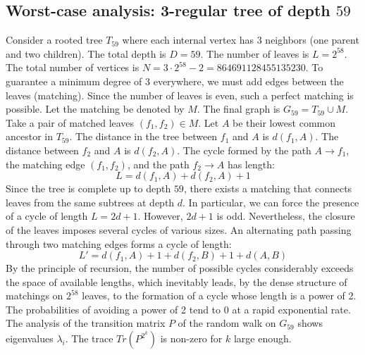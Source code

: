 \documentclass[11pt,a4paper]{article}
\begin{document}
\subsection{Worst-case analysis: 3-regular tree of depth $59$}
Consider a rooted tree $T_{59}$ where each internal vertex has 3 neighbors (one parent and two children).
The total depth is $D = 59$.
The number of leaves is $L = 2^{58}$.
The total number of vertices is $N = 3 \cdot 2^{58} - 2 = 864691128455135230$.
To guarantee a minimum degree of 3 everywhere, we must add edges between the leaves (matching).
Since the number of leaves is even, such a perfect matching is possible.
Let the matching be denoted by $M$. The final graph is $G_{59} = T_{59} \cup M$.
Take a pair of matched leaves $(f_1, f_2) \in M$.
Let $A$ be their lowest common ancestor in $T_{59}$.
The distance in the tree between $f_1$ and $A$ is $d(f_1, A)$.
The distance between $f_2$ and $A$ is $d(f_2, A)$.
The cycle formed by the path $A \to f_1$, the matching edge $(f_1, f_2)$, and the path $f_2 \to A$ has length:
$$ L = d(f_1, A) + d(f_2, A) + 1 $$
Since the tree is complete up to depth $59$, there exists a matching that connects leaves from the same subtrees at depth $d$.
In particular, we can force the presence of a cycle of length $L = 2d + 1$. However, $2d+1$ is odd.
Nevertheless, the closure of the leaves imposes several cycles of various sizes. An alternating path passing through two matching edges forms a cycle of length:
$$ L' = d(f_1, A) + 1 + d(f_2, B) + 1 + d(A, B) $$
By the principle of recursion, the number of possible cycles considerably exceeds the space of available lengths, which inevitably leads, by the dense structure of matchings on $2^{58}$ leaves, to the formation of a cycle whose length is a power of 2. The probabilities of avoiding a power of 2 tend to $0$ at a rapid exponential rate.
The analysis of the transition matrix $P$ of the random walk on $G_{59}$ shows eigenvalues $\lambda_i$. The trace $Tr(P^{2^k})$ is non-zero for $k$ large enough.
\end{document}
